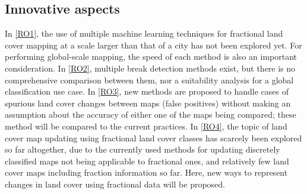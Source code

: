 \documentclass[10pt]{article}
\begin{document}
\begin{mdframed}[style=table,frametitle=\textbf{7. DETAILED DESCRIPTION OF THE RESEARCH PLAN} (max. 2500 words + 1 page literature list)]
\section{Innovative aspects}

In \ref{RO1}, the use of multiple machine learning techniques for fractional land cover mapping at a scale larger than that of a city has not been explored yet. For performing global-scale mapping, the speed of each method is also an important consideration. In \ref{RO2}, multiple break detection methods exist, but there is no comprehensive comparison between them, nor a suitability analysis for a global classification use case. In \ref{RO3}, new methods are proposed to handle cases of spurious land cover changes between maps (false positives) without making an assumption about the accuracy of either one of the maps being compared; these method will be compared to the current practices. In \ref{RO4}, the topic of land cover map updating using fractional land cover classes has scarcely been explored so far altogether, due to the currently used methods for updating discretely classified maps not being applicable to fractional ones, and relatively few land cover maps including fraction information so far. Here, new ways to represent changes in land cover using fractional data will be proposed.


\end{mdframed}

\end{document}
